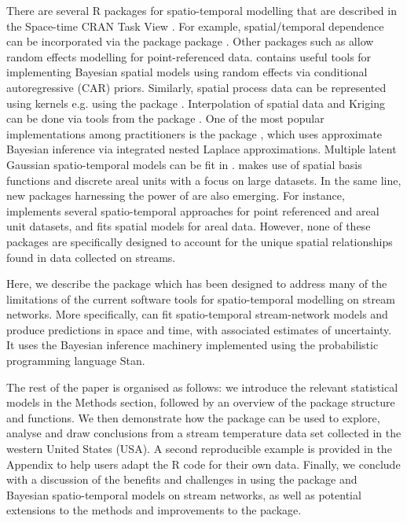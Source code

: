 There are several \textsf{R} packages for spatio-temporal modelling that are described in the Space-time CRAN Task View \citep{cranSpaceTime}. For example, spatial/temporal dependence can be incorporated via the  package  package \citep{nlmeBook, nlme}. 
Other packages such as  \citep{spBayes} allow random effects modelling for point-referenced data. 
 \citep{CARBayes} contains useful tools for implementing Bayesian spatial models using random effects via conditional autoregressive (CAR) priors. 
Similarly, spatial process data can be represented using kernels
e.g. using the package   \citep{RandomFields}. 
Interpolation of spatial data and Kriging can be done via tools from the package  \citep{geoR}. 
One of the most popular implementations among practitioners is the  package \citep{rinla}, which uses approximate Bayesian inference via integrated nested Laplace approximations. 
Multiple latent Gaussian spatio-temporal models can be fit in . 
 \citep{FRKpaper} makes use of spatial basis functions and discrete areal units with a focus on large datasets. 
In the same line, new packages harnessing the power of  \citep{carpenter2017stan} are also emerging. For instance,  \citep{bmstdr} implements several spatio-temporal approaches for point referenced and areal unit datasets, and   \citep{geostan} fits spatial models for areal data.    
However, none of these packages are specifically designed to account for the unique spatial relationships found in data collected on streams.  

Here, we describe the  package which has been designed to address many of the limitations of the current software tools for spatio-temporal modelling on stream networks. More specifically,  can fit spatio-temporal stream-network models and produce predictions in space and time, with associated estimates of uncertainty. It uses the Bayesian inference machinery implemented using the probabilistic programming language \textsf{Stan}. 

The rest of the paper is organised as follows: we introduce the relevant statistical models in the Methods section, followed by an overview of the package structure and functions. We then demonstrate how the  package can be used to explore, analyse and draw conclusions from a stream temperature data set collected in the western United States (USA). A second reproducible example is provided in the Appendix to help users adapt the \textsf{R} code for their own data. Finally, we conclude with a discussion of the benefits and challenges in using the  package and Bayesian spatio-temporal models on stream networks, as well as potential extensions to the methods and improvements to the package.



